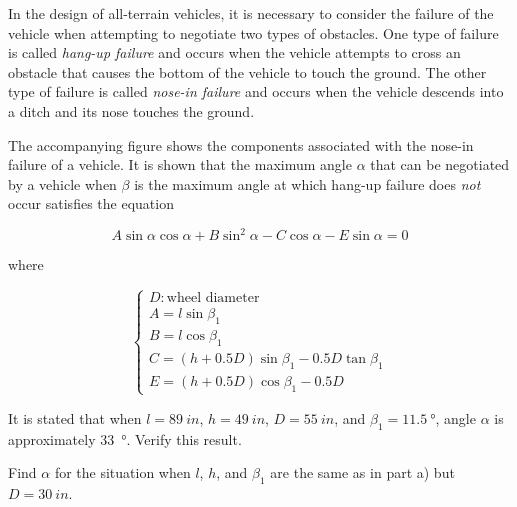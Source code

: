 \documentclass[../../../../Assignments]{subfiles}
\begin{document}
\begin{exercise}
    In the design of all-terrain vehicles, it is necessary to consider the
    failure of the vehicle when attempting to negotiate two types of obstacles.
    One type of failure is called \emph{hang-up failure} and occurs when the
    vehicle attempts to cross an obstacle that causes the bottom of the vehicle
    to touch the ground. The other type of failure is called \emph{nose-in
    failure} and occurs when the vehicle descends into a ditch and its nose
    touches the ground.

    The accompanying figure shows the components associated with the nose-in
    failure of a vehicle. It is shown that the maximum angle \(\alpha\) that can
    be negotiated by a vehicle when \(\beta\) is the maximum angle at which
    hang-up failure does \emph{not} occur satisfies the equation

    \[A \sin{\alpha} \cos{\alpha} + B \sin^{2}{\alpha} - C \cos{\alpha} - E \sin{\alpha} = 0\]

    \noindent where

    \[\begin{cases}
        D: \text{wheel diameter} \\
        A = l \sin{\beta_1} \\
        B = l \cos{\beta_1} \\
        C = (h + \num{0.5} D) \sin{\beta_1} - \num{0.5} D \tan{\beta_1} \\
        E = (h + \num{0.5} D) \cos{\beta_1} - \num{0.5} D
    \end{cases}\]

    \begin{tasks}
        \task It is stated that when \(l = \SI{89}{in}\), \(h = \SI{49}{in}\),
            \(D = \SI{55}{in}\), and \(\beta_1 = \SI{11.5}{\degree}\), angle
            \(\alpha\) is approximately \SI{33}{\degree}. Verify this result.

        \task Find \(\alpha\) for the situation when \(l\), \(h\), and
            \(\beta_1\) are the same as in part a) but \(D = \SI{30}{in}\).
    \end{tasks}
\end{exercise}
\end{document}
